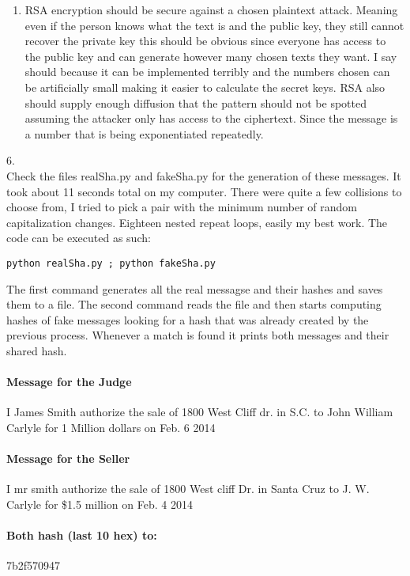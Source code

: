 \documentclass{article}
\begin{document}
\begin{enumerate}
\item
  RSA encryption should be secure against a chosen plaintext attack. Meaning even if the person knows what the text is and the public key, they still cannot recover the private key this should be obvious since everyone has access to the public key and can generate however many chosen texts they want. I say should because it can be implemented terribly and the numbers chosen can be artificially small making it easier to calculate the secret keys. RSA also should supply enough diffusion that the pattern should not be spotted assuming the attacker only has access to the ciphertext. Since the message is a number that is being exponentiated repeatedly.  

\end{enumerate}

6.\\
Check the files realSha.py and fakeSha.py for the generation of these messages. It took about 11 seconds total on my computer. There were quite a few collisions to choose from, I tried to pick a pair with the minimum number of random capitalization changes. Eighteen nested repeat loops, easily my best work. The code can be executed as such: 
\begin{verbatim}python realSha.py ; python fakeSha.py\end{verbatim}
The first command generates all the real messagse and their hashes and saves them to a file. The second command reads the file and then starts computing hashes of fake messages looking for a hash that was already created by the previous process. Whenever a match is found it prints both messages and their shared hash.

\paragraph{Message for the Judge}{I James Smith authorize the sale of 1800 West Cliff dr. in S.C. to John William Carlyle for 1 Million dollars on Feb. 6 2014}
\paragraph{Message for the Seller}{I mr smith authorize the sale of 1800 West cliff Dr. in Santa Cruz to J. W. Carlyle for \$1.5 million on Feb. 4 2014}
\paragraph{Both hash (last 10 hex) to:}{7b2f570947}
\pagebreak
\end{document}
